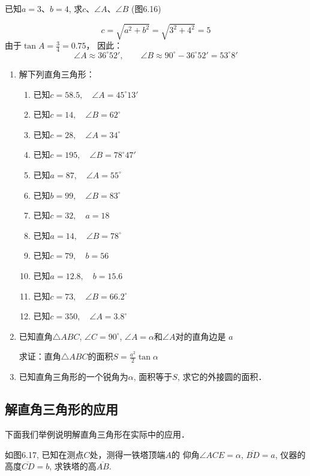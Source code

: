 \begin{example}
    已知$a=3$、$b=4$, 求$c$、$\angle A$、$\angle B$ (图6.16)
\end{example}

\begin{solution}
\[c=\sqrt{a^2+b^2}=\sqrt{3^2+4^2}=5\]
由于$\tan A=\frac{3}{4}=0.75$，
因此：$$\angle A\approx 36^{\circ} 52',\qquad 
\angle B\approx 90^{\circ} -36^{\circ} 52'=53^{\circ} 8'$$ 
\end{solution}

\begin{ex}
\begin{enumerate}
    \item 解下列直角三角形：
    \begin{enumerate}
    \item 已知$c=58.5,\quad \angle A=45^{\circ} 13'$
    \item 已知$c=14,\quad \angle B=62^{\circ}$
    \item 已知$c=28,\quad \angle A=34^{\circ} $
    \item 已知$c=195,\quad \angle B=78^{\circ} 47'$
    \item 已知$a=87,\quad \angle A=55^{\circ} $
    \item 已知$b=99,\quad \angle B=83^{\circ} $
    \item 已知$c=32,\quad a=18$
    \item 已知$a=14,\quad \angle B=78^{\circ}$
    \item 已知$c=79,\quad b=56$
    \item 已知$a=12.8,\quad b=15.6$
    \item 已知$c=73,\quad \angle B=66.2^{\circ}$ 
    \item 已知$c=350,\quad \angle A=3.8^{\circ} $
\end{enumerate}

\item 已知直角$\triangle ABC$, $\angle C=90^{\circ}$, $\angle A=\alpha$和$\angle A$对的直角边是
$a$

求证：直角$\triangle ABC$的面积$S=\frac{a^2}{2}\tan\alpha$

\item  已知直角三角形的一个锐角为$\alpha$, 面积等于$S$, 
求它的外接圆的面积．
\end{enumerate}
\end{ex}

\subsection{解直角三角形的应用}
下面我们举例说明解直角三角形在实际中的应用．
\begin{example}
如图6.17, 已知在测点$C$处，测得一铁塔顶端$A$的
仰角$\angle ACE=\alpha$, $\overline{BD}=a$, 仪器的高度$\overline{CD}=b$, 求铁塔的高$\overline{AB}$.

\end{example}


